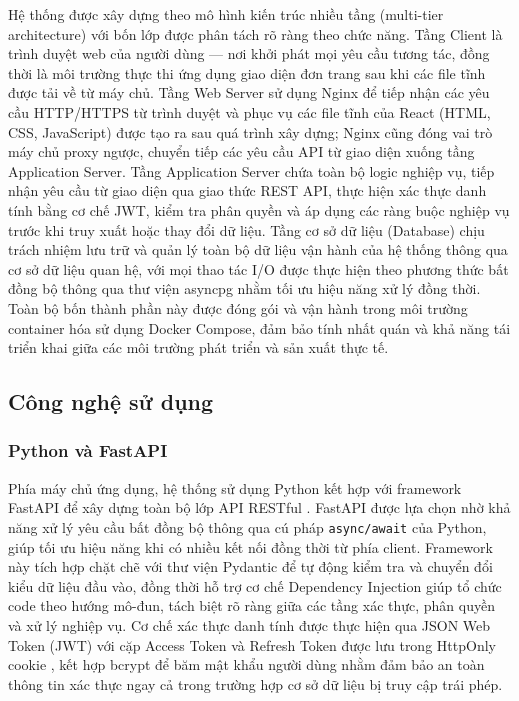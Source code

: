 \documentclass[13pt,a4paper]{extarticle}
\numberwithin{figure}{section}
\numberwithin{table}{section}
\begin{document}
	Hệ thống được xây dựng theo mô hình kiến trúc nhiều tầng (multi-tier
	architecture) với bốn lớp được phân tách rõ ràng theo chức năng.
	Tầng Client là trình duyệt web của người dùng --- nơi khởi phát mọi
	yêu cầu tương tác, đồng thời là môi trường thực thi ứng dụng giao
	diện đơn trang sau khi các file tĩnh được tải về từ máy chủ.
	Tầng Web Server sử dụng Nginx để tiếp nhận các yêu cầu HTTP/HTTPS từ
	trình duyệt và phục vụ các file tĩnh của React (HTML, CSS, JavaScript)
	được tạo ra sau quá trình xây dựng; Nginx cũng đóng vai trò máy chủ proxy ngược,
	chuyển tiếp các yêu cầu API từ giao diện xuống tầng Application Server.
	Tầng Application Server chứa toàn bộ logic nghiệp vụ, tiếp nhận yêu
	cầu từ giao diện qua giao thức REST API, thực hiện xác thực danh tính
	bằng cơ chế JWT, kiểm tra phân quyền và áp dụng các ràng buộc nghiệp
	vụ trước khi truy xuất hoặc thay đổi dữ liệu.
	Tầng cơ sở dữ liệu (Database) chịu trách nhiệm lưu trữ và quản lý toàn bộ dữ
	liệu vận hành của hệ thống thông qua cơ sở dữ liệu quan hệ,
	với mọi thao tác I/O được thực hiện theo phương thức bất đồng bộ thông
	qua thư viện asyncpg nhằm tối ưu hiệu năng xử lý đồng thời.
	Toàn bộ bốn thành phần này được đóng gói và vận hành trong môi trường
	container hóa sử dụng Docker Compose, đảm bảo tính nhất quán và khả
	năng tái triển khai giữa các môi trường phát triển và sản xuất thực tế.
	
	\subsection{Công nghệ sử dụng}
	
	\subsubsection{Python và FastAPI}
	
	Phía máy chủ ứng dụng, hệ thống sử dụng Python kết hợp với framework FastAPI để xây dựng toàn bộ lớp API RESTful \cite{fastapi}. FastAPI được lựa chọn nhờ khả năng xử lý yêu cầu bất đồng bộ thông qua cú pháp \texttt{async/await} của Python, giúp tối ưu hiệu năng khi có nhiều kết nối đồng thời từ phía client. Framework này tích hợp chặt chẽ với thư viện Pydantic để tự động kiểm tra và chuyển đổi kiểu dữ liệu đầu vào, đồng thời hỗ trợ cơ chế Dependency Injection giúp tổ chức code theo hướng mô-đun, tách biệt rõ ràng giữa các tầng xác thực, phân quyền và xử lý nghiệp vụ. Cơ chế xác thực danh tính được thực hiện qua JSON Web Token (JWT) với cặp Access Token và Refresh Token được lưu trong HttpOnly cookie \cite{jwt}, kết hợp bcrypt để băm mật khẩu người dùng nhằm đảm bảo an toàn thông tin xác thực ngay cả trong trường hợp cơ sở dữ liệu bị truy cập trái phép.
	
\end{document}
